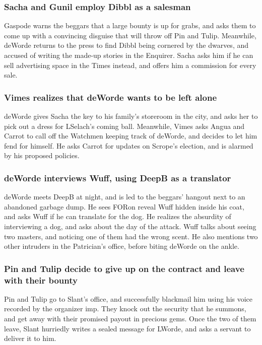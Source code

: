 \subsubsection{\Gls{Sacha} and \Gls{Gunil} employ \Gls{Dibbl} as a salesman}
\Gls{Gaspode} warns the beggars that a large bounty is up for grabs, and asks them to come up with
a convincing disguise that will throw off \Gls{Pin} and \Gls{Tulip}. Meanwhile, \Gls{deWorde}
returns to the press to find \Gls{Dibbl} being cornered by the dwarves, and accused of writing the
made-up stories in the Enquirer. \Gls{Sacha} asks him if he can sell advertising space in the Times
instead, and offers him a commission for every sale.

\subsubsection{\Gls{Vimes} realizes that \Gls{deWorde} wants to be left alone}
\Gls{deWorde} gives \Gls{Sacha} the key to his family's storeroom in the city, and asks her to pick
out a dress for \Gls{LSelach}'s coming ball. Meanwhile, \Gls{Vimes} asks \Gls{Angua} and
\Gls{Carrot} to call off the Watchmen keeping track of \Gls{deWorde}, and decides to let him fend
for himself. He asks \Gls{Carrot} for updates on \Gls{Scrope}'s election, and is alarmed by his
proposed policies.

\subsubsection{\Gls{deWorde} interviews \Gls{Wuff}, using \Gls{DeepB} as a translator}
\Gls{deWorde} meets \Gls{DeepB} at night, and is led to the beggars' hangout next to an abandoned
garbage dump. He sees \Gls{FORon} reveal \Gls{Wuff} hidden inside his coat, and asks \Gls{Wuff} if
he can translate for the dog. He realizes the absurdity of interviewing a dog, and asks about the
day of the attack. \Gls{Wuff} talks about seeing two masters, and noticing one of them had the
wrong scent. He also mentions two other intruders in the Patrician's office, before biting
\Gls{deWorde} on the ankle.

\subsubsection{\Gls{Pin} and \Gls{Tulip} decide to give up on the contract and leave with their
    bounty}
\Gls{Pin} and \Gls{Tulip} go to \Gls{Slant}'s office, and successfully blackmail him using his
voice recorded by the organizer imp. They knock out the security that he summons, and get away with
their promised payout in precious gems. Once the two of them leave, \Gls{Slant} hurriedly writes a
sealed message for \Gls{LWorde}, and asks a servant to deliver it to him.

